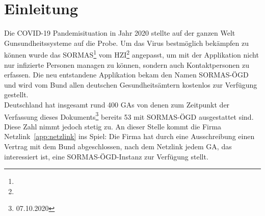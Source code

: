 \chapter{Einleitung}

Die \ac{COVID-19} Pandemisituation in Jahr 2020 stellte auf der ganzen Welt Gunsundheitssysteme auf die Probe. 
Um das Virus bestmöglich bekämpfen zu können wurde das \ac{SORMAS}\footnote{} vom \ac{HZI}\footnote{} angepasst, um mit der Applikation nicht nur infizierte Personen managen zu können, sondern auch Kontaktpersonen zu erfassen.
Die neu entstandene Applikation bekam den Namen \ac{SORMAS-ÖGD} und wird vom Bund allen deutschen Gesundheitsämtern kostenlos zur Verfügung gestellt. 
\cite{SORMAS_covid}
\\
Deutschland hat insgesamt rund 400 \ac{GAs} \cite{GAs} von denen zum Zeitpunkt der Verfassung dieses Dokuments\footnote{07.10.2020} bereits 53 mit \ac{SORMAS-ÖGD} ausgestattet sind.
Diese Zahl nimmt jedoch stetig zu.  
An dieser Stelle kommt die Firma Netzlink~\ref{app:netzlink} ins Spiel: 
Die Firma hat durch eine Ausschreibung einen Vertrag mit dem Bund abgeschlossen, nach dem Netzlink jedem \ac{GA}, das interessiert ist, eine \ac{SORMAS-ÖGD}-Instanz zur Verfügung stellt.

